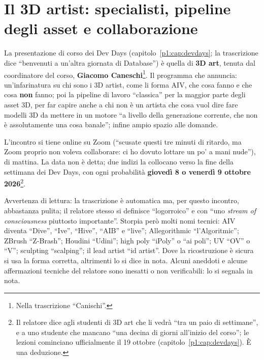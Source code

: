 %

\chapter[Il 3D artist]{Il 3D artist: specialisti, pipeline degli asset e
collaborazione}
\label{p6:cap:3d}

La presentazione di corso dei Dev Days (capitolo~\ref{p1:cap:devdays};
la trascrizione dice ``benvenuti a un'altra giornata di Database'') è quella
di \textbf{3D art}, tenuta dal coordinatore del corso, \textbf{Giacomo
Caneschi}\footnote{Nella trascrizione ``Canischi''.}. Il programma che
annuncia: un'infarinatura su chi sono i 3D artist, come li forma AIV, che cosa
fanno e che cosa \textbf{non} fanno; poi la pipeline di lavoro ``classica''
per la maggior parte degli asset 3D, per far capire anche a chi non è un
artista che cosa vuol dire fare modelli 3D da mettere in un motore ``a livello
della generazione corrente, che non è assolutamente una cosa banale''; infine
ampio spazio alle domande.

L'incontro si tiene online su Zoom (``scusate questi tre minuti di ritardo, ma
Zoom proprio non voleva collaborare: ci ho dovuto lottare un po' a mani
nude''), di mattina. La data non è detta; due indizi la collocano verso la fine
della settimana dei Dev Days, con ogni probabilità \textbf{giovedì 8 o venerdì
9 ottobre 2026}\footnote{Il relatore dice agli studenti di 3D art che li vedrà
``tra un paio di settimane'', e a uno studente che mancano ``una decina di
giorni all'inizio del corso''; le lezioni cominciano ufficialmente il 19
ottobre (capitolo~\ref{p1:cap:devdays}). È una deduzione.}.

Avvertenza di lettura: la trascrizione è automatica ma, per questo incontro,
abbastanza pulita; il relatore stesso si definisce ``logorroico'' e con ``uno
\emph{stream of consciousness} piuttosto importante''. Storpia però molti nomi
tecnici: AIV diventa ``Dive'', ``Ive'', ``Hive'', ``AIB'' e ``live'';
Allegorithmic ``l'Algoritmic''; ZBrush ``Z-Brash''; Houdini ``Udini''; high
poly ``iPoly'' o ``ai poli''; UV ``OV'' o ``V''; sculpting ``scalping''; il
lead artist ``id artist''. Dove la ricostruzione è sicura si usa la forma
corretta, altrimenti lo si dice in nota. Alcuni aneddoti e alcune affermazioni
tecniche del relatore sono inesatti o non verificabili: lo si segnala in nota.

